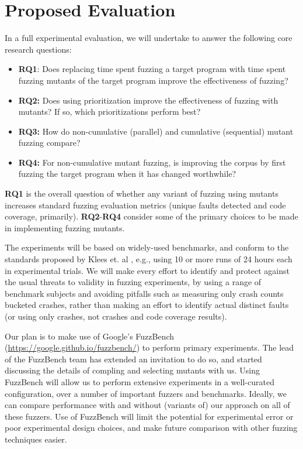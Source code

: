 \section{Proposed Evaluation}

In a full experimental evaluation, we will undertake to answer the following core research questions:

\begin{itemize}
  \item {\bf RQ1}: Does replacing time spent fuzzing a target program with time spent fuzzing mutants of the target program improve
  the effectiveness of fuzzing?
  \item {\bf RQ2:} Does using prioritization improve the effectiveness of fuzzing with mutants?  If so, which prioritizations perform best?
  \item {\bf RQ3:} How do non-cumulative (parallel) and cumulative (sequential) mutant fuzzing compare?
  \item {\bf RQ4:} For non-cumulative mutant fuzzing, is improving the corpus by first fuzzing the target program when it has changed worthwhile?
  \end{itemize}
  
{\bf RQ1} is the overall question of whether any variant of fuzzing using mutants increases standard fuzzing evaluation metrics
(unique faults detected and code coverage, primarily).  {\bf RQ2}-{\bf RQ4} consider some of the primary choices to be made in implementing fuzzing mutants.

The experiments will be based on widely-used benchmarks, and conform to the standards proposed by Klees et. al \cite{evalfuzz}, e.g., using 10 or
more runs of 24 hours each in experimental trials.  We will make every effort to identify and protect against the usual threats to validity in fuzzing experiments, by using a range of benchmark subjects and avoiding pitfalls such as measuring only crash counts bucketed crashes, rather than making an effort to identify actual distinct faults \cite{FuzzAppeal} (or using only crashes, not crashes and code coverage results).

Our plan is to make use of Google's FuzzBench \cite{metzman2021fuzzbench} (\url{https://google.github.io/fuzzbench/}) to perform primary experiments.  The lead of the FuzzBench team has extended an invitation to do so, and started discussing the details of compling and selecting mutants with us.  Using FuzzBench will allow us to perform extensive experiments in a well-curated configuration, over a number of important fuzzers and benchmarks.  Ideally, we can compare performance with and without (variants of) our approach on all of these fuzzers.  Use of FuzzBench will limit the potential for experimental error or poor experimental design choices, and make future comparison with other fuzzing techniques easier.

